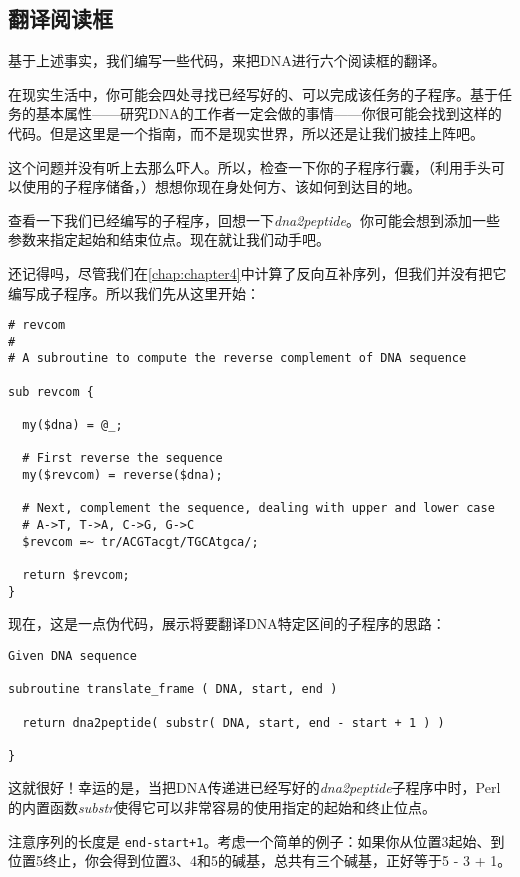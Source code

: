 \subsection{翻译阅读框}
基于上述事实，我们编写一些代码，来把DNA进行六个阅读框的翻译。

在现实生活中，你可能会四处寻找已经写好的、可以完成该任务的子程序。基于任务的基本属性——研究DNA的工作者一定会做的事情——你很可能会找到这样的代码。但是这里是一个指南，而不是现实世界，所以还是让我们披挂上阵吧。

这个问题并没有听上去那么吓人。所以，检查一下你的子程序行囊，（利用手头可以使用的子程序储备，）想想你现在身处何方、该如何到达目的地。

查看一下我们已经编写的子程序，回想一下\textit{dna2peptide}。你可能会想到添加一些参数来指定起始和结束位点。现在就让我们动手吧。

还记得吗，尽管我们在\autoref{chap:chapter4}中计算了反向互补序列，但我们并没有把它编写成子程序。所以我们先从这里开始：

\begin{lstlisting}
# revcom 
#
# A subroutine to compute the reverse complement of DNA sequence

sub revcom {

  my($dna) = @_;

  # First reverse the sequence
  my($revcom) = reverse($dna);

  # Next, complement the sequence, dealing with upper and lower case
  # A->T, T->A, C->G, G->C
  $revcom =~ tr/ACGTacgt/TGCAtgca/;

  return $revcom;
}
\end{lstlisting}

现在，这是一点伪代码，展示将要翻译DNA特定区间的子程序的思路：

\begin{lstlisting}
Given DNA sequence

subroutine translate_frame ( DNA, start, end )

  return dna2peptide( substr( DNA, start, end - start + 1 ) )

}
\end{lstlisting}

这就很好！幸运的是，当把DNA传递进已经写好的\textit{dna2peptide}子程序中时，Perl的内置函数\textit{substr}使得它可以非常容易的使用指定的起始和终止位点。

注意序列的长度是 \verb|end-start+1|。考虑一个简单的例子：如果你从位置3起始、到位置5终止，你会得到位置3、4和5的碱基，总共有三个碱基，正好等于5 - 3 + 1。


